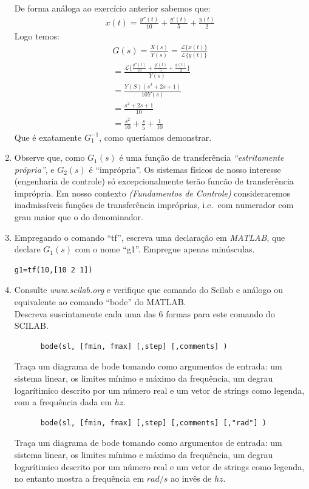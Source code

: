 \documentclass[12pt,a4paper]{article}
\begin{document}
\begin{enumerate}
    De forma análoga ao exercício anterior sabemos que:
    \begin{align}
      x(t)=\frac{y''(t)}{10}+\frac{y'(t)}{5}+\frac{y(t)}{2} \nonumber
    \end{align} 
    Logo temos:
    \begin{align*}
      G(s)=\frac{X(s)}{Y(s)}=\frac{\mathcal{L}\{x(t)\}}{\mathcal{L}\{y(t)\}}\\
      =\frac{\mathcal{L}\{\frac{y''(t)}{10}+\frac{y'(t)}{5}+\frac{y(t)}{2}\}}{Y(s)}\\
      =  \frac{Y(S)(s^2+2s+1)}{10Y(s)}\\
      =\frac{s^2+2s+1}{10}\\
      =\frac{s^2}{10}+\frac{s}{5}+\frac{1}{10}
    \end{align*}
    Que é exatamente $G_1^{-1}$, como queríamos demonstrar.
  \item Observe que, como $G_1(s)$ é uma função de transferência \emph{``estritamente própria”},
    e  $G_2(s)$ é ``imprópria”. Os sistemas físicos de nosso interesse (engenharia de controle)
    só excepcionalmente terão funcão de transferência imprópria. Em nosso contexto 
    \emph{(Fundamentos de Controle)} consideraremos inadmissíveis funções de transferência
    impróprias, i.e.\, com numerador com grau maior que o do denominador. 
  \item Empregando o comando ``tf”, escreva uma declaração em \emph{MATLAB}, que declare
    $G_1(s)$ com o nome ``g1”. Empregue apenas minúsculas.
    \begin{lstlisting}[label=matlab:1, caption=Código em MATLAB para a função de transferência $G_1(s)$]
      g1=tf(10,[10 2 1])
    \end{lstlisting}
  \item  Consulte \emph{www.scilab.org} e verifique que comando do Scilab e análogo ou equivalente
    ao comando ``bode” do MATLAB.\\Descreva suscintamente cada uma das 6 formas
    para este comando do SCILAB.

    \begin{lstlisting}
      bode(sl, [fmin, fmax] [,step] [,comments] )
    \end{lstlisting}
    Traça um diagrama de bode tomando como argumentos de entrada: um sistema linear, os limites 
    mínimo e máximo da frequência, um degrau logarítimico descrito por um número 
    real e um vetor de strings como legenda, com a frequência dada em $hz$.
    \vfill
    \begin{lstlisting}
      bode(sl, [fmin, fmax] [,step] [,comments] [,"rad"] )
    \end{lstlisting}
    Traça um diagrama de bode tomando como argumentos de entrada: um sistema linear, os limites 
    mínimo e máximo da frequência, um degrau logarítimico descrito por um número 
    real e um vetor de strings como legenda, no entanto mostra a frequência
    em $rad/s$ ao invês de $hz$.


\end{enumerate}
\end{document}
